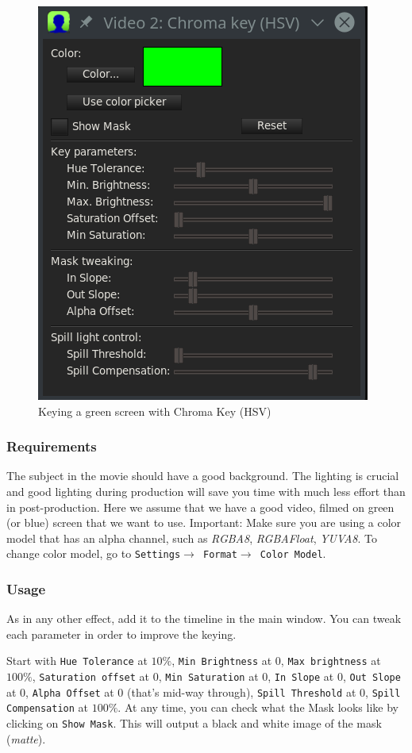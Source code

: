 \begin{figure}[htpb]
    \centering
    \includegraphics[width=0.6\linewidth]{images/chroma-key-hsv.png}
    \caption{Keying a green screen with Chroma Key (HSV)}
    \label{fig:chroma-key-hsv}
\end{figure}

\subsubsection*{Requirements}
\label{ssub:requirements}

The subject in the movie should have a good background. The lighting is crucial and good lighting during production will save you time with much less effort than in post-production.
Here we assume that we have a good video, filmed on green (or blue) screen that we want to use. Important: Make sure you are using a color model that has an alpha channel, such as \textit{RGBA8}, \textit{RGBAFloat}, \textit{YUVA8}. To change color model, go to \texttt{Settings$\rightarrow$ Format$\rightarrow$ Color Model}.

\subsubsection*{Usage}
\label{ssub:usage}

As in any other effect, add it to the timeline in the main window. You can tweak each parameter in order to improve the keying.

Start with \texttt{Hue Tolerance} at $10\%$, \texttt{Min Brightness} at $0$, \texttt{Max brightness} at $100\%$, \texttt{Saturation offset} at $0$, \texttt{Min Saturation} at $0$, \texttt{In Slope} at $0$, \texttt{Out Slope} at $0$, \texttt{Alpha Offset} at $0$ (that’s mid-way through), \texttt{Spill Threshold} at $0$, \texttt{Spill Compensation} at $100\%$. At any time, you can check what the Mask looks like by clicking on \texttt{Show Mask}. This will output a black and white image of the mask (\textit{matte}).

